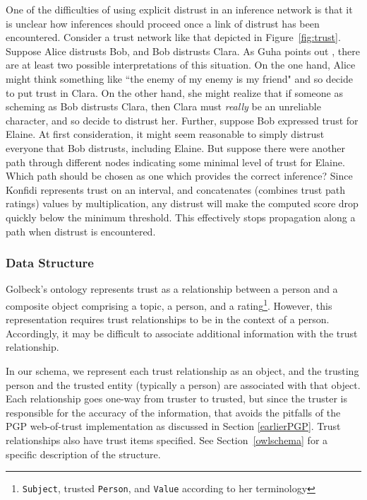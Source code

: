 \documentclass[letterpaper]{www2006-submission}
\begin{document}
One of the difficulties of using explicit distrust in an inference network is that it is unclear how inferences should proceed once a link of distrust has been encountered.  Consider a trust network like that depicted in Figure~\ref{fig:trust}.  Suppose Alice distrusts Bob, and Bob distrusts Clara.  As Guha points out \citep{guha04propagation}, there are at least two possible interpretations of this situation.  On the one hand, Alice might think something like ``the enemy of my enemy is my friend" and so decide to put trust in Clara.  On the other hand, she might realize that if someone as scheming as Bob distrusts Clara, then Clara must \textit{really} be an unreliable character, and so decide to distrust her.  Further, suppose Bob expressed trust for Elaine.  At first consideration, it might seem reasonable to simply distrust everyone that Bob distrusts, including Elaine.  But suppose there were another path through different nodes indicating some minimal level of trust for Elaine.  Which path should be chosen as one which provides the correct inference?  Since Konfidi represents trust on an interval, and concatenates (combines trust path ratings) values by multiplication, any distrust will make the computed score drop quickly below the minimum threshold.  This effectively stops propagation along a path when distrust is encountered.

\subsubsection{Data Structure}
\label{rating}
Golbeck's ontology represents trust as a relationship between a person and a composite object comprising a topic, a person, and a rating\footnote{\texttt{Subject}, trusted \texttt{Person}, and \texttt{Value} according to her terminology}.  However, this representation requires trust relationships to be in the context of a person.  Accordingly, it may be difficult to associate additional information with the trust relationship.  

In our schema, we represent each trust relationship as an object, and the trusting person and the trusted entity (typically a person) are associated with that object.  Each relationship goes one-way from truster to trusted, but since the truster is responsible for the accuracy of the information, that avoids the pitfalls of the PGP web-of-trust implementation as discussed in Section \ref{earlierPGP}.  Trust relationships also have trust items specified.  See Section~\ref{owlschema} for a specific description of the structure.
\end{document}
